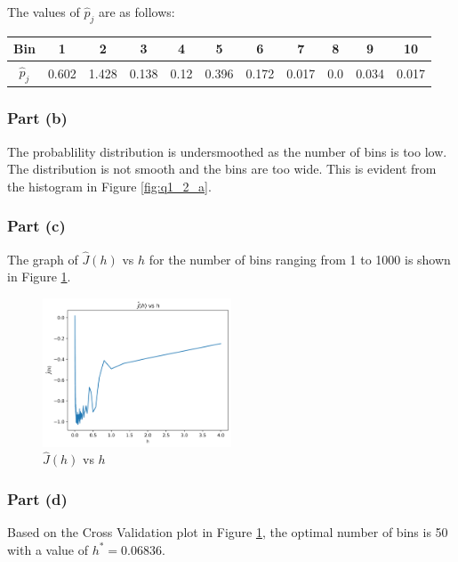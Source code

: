The values of $\hat{p}_j$ are as follows:

\begin{tabular}
    { |c|c|c|c|c|c|c|c|c|c|c| }
    \hline
    Bin & 1 & 2 & 3 & 4 & 5 & 6 & 7 & 8 & 9 & 10 \\
    \hline
    $\hat{p}_j$ & 0.602 & 1.428 & 0.138 & 0.12 & 0.396 & 0.172 & 0.017 & 0.0 & 0.034 & 0.017 \\
    \hline
\end{tabular}

\subsubsection{Part (b)}

The probablility distribution is undersmoothed as the number of bins is too low. The distribution is not smooth and the bins are too wide. This is evident from the histogram in Figure \ref{fig:q1_2_a}.

\subsubsection{Part (c)}

The graph of $\hat{J}(h)$ vs $h$ for the number of bins ranging from 1 to 1000 is shown in Figure \ref{fig:q1_2_c}.

\begin{figure}[H]
    \centering
    \includegraphics[width=0.5\textwidth]{../q1/images/crossvalidation.png}
    \caption{$\hat{J}(h)$ vs $h$}
    \label{fig:q1_2_c}
\end{figure}

\subsubsection{Part (d)}

Based on the Cross Validation plot in Figure \ref{fig:q1_2_c}, the optimal number of bins is 50 with a value of $h^\ast = 0.06836$.

